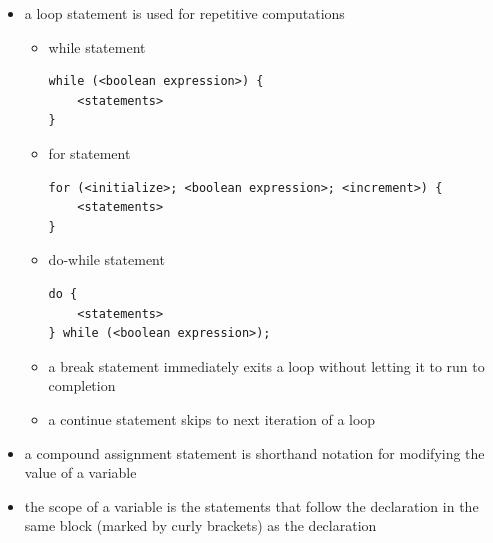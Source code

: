 \documentclass[8pt,a4paper,compress]{beamer}
\begin{document}
\begin{frame}[fragile]

\begin{itemize}
\item a loop statement is used for repetitive computations

\begin{itemize}
\item while statement
\begin{lstlisting}[language={}]
while (<boolean expression>) {
    <statements>
}
\end{lstlisting}

\item for statement
\begin{lstlisting}[language={}]
for (<initialize>; <boolean expression>; <increment>) {
    <statements>
}
\end{lstlisting}

\item do-while statement 
\begin{lstlisting}[language={}]
do {
    <statements>
} while (<boolean expression>);
\end{lstlisting}

\item a break statement immediately exits a loop without letting it to run to completion

\item a continue statement skips to next iteration of a loop
\end{itemize}

\item a compound assignment statement is shorthand notation for modifying the value of a variable

\item the scope of a variable is the statements that follow the declaration in the same block (marked by curly brackets) as the declaration
\end{itemize}
\end{frame}
\end{document}

